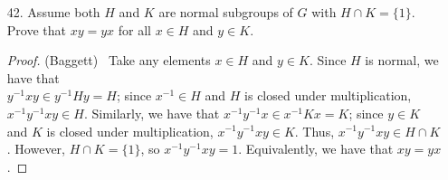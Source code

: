\documentclass[10pt]{article}
\theoremstyle{plain}
\newtheorem*{cor*}{Corollary}
\begin{document}
\begin{itemize}
\begin{cor*}
$G/N$ is Abelian.
\end{cor*}

\begin{proof}[Proof (Granade)]
Let $aN,bN\in G/N$. Then, we claim that $abN=baN$. It is thus sufficient
to show that $ab\left(ba\right)^{-1}\in N$. But then,
$ab\left(ba\right)^{-1}=aba^{-1}b^{-1}\in N$.
\end{proof}



\item[42.] Assume both $H$ and $K$ are normal subgroups of $G$ with $H \cap K = \{1\}$. Prove
that $xy = yx$ for all $x \in H$ and $y \in K$.

\begin{proof}(Baggett) \ Take any elements $x \in H$ and $y \in K$. Since $H$ is normal, we
have that \\ $y^{-1}xy \in y^{-1}Hy = H$; since $x^{-1} \in H$ and $H$ is closed under multiplication,
$x^{-1}y^{-1}xy \in H$. Similarly, we have that $x^{-1}y^{-1}x \in x^{-1}Kx = K$; since $y \in K$
and $K$ is closed under multiplication, $x^{-1}y^{-1}xy \in K$. Thus, $x^{-1}y^{-1}xy \in H \cap K$.
However, $H \cap K = \{1\}$, so $x^{-1}y^{-1}xy = 1$. Equivalently, we have that $xy = yx$.
\end{proof}

\end{itemize}
\end{document}
